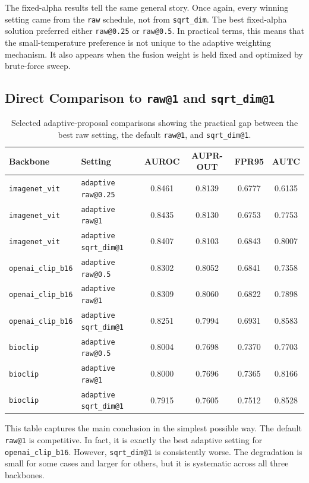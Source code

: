 \documentclass[11pt]{article}
\begin{document}
The fixed-alpha results tell the same general story. Once again, every winning setting came from the \texttt{raw} schedule, not from \texttt{sqrt\_dim}. The best fixed-alpha solution preferred either \texttt{raw@0.25} or \texttt{raw@0.5}. In practical terms, this means that the small-temperature preference is not unique to the adaptive weighting mechanism. It also appears when the fusion weight is held fixed and optimized by brute-force sweep.

\subsection{Direct Comparison to \texttt{raw@1} and \texttt{sqrt\_dim@1}}

\begin{table}[h]
\centering
\small
\begin{tabular}{llcccc}
\toprule
Backbone & Setting & AUROC & AUPR-OUT & FPR95 & AUTC \\
\midrule
\texttt{imagenet\_vit} & \texttt{adaptive raw@0.25} & 0.8461 & 0.8139 & 0.6777 & 0.6135 \\
\texttt{imagenet\_vit} & \texttt{adaptive raw@1} & 0.8435 & 0.8130 & 0.6753 & 0.7753 \\
\texttt{imagenet\_vit} & \texttt{adaptive sqrt\_dim@1} & 0.8407 & 0.8103 & 0.6843 & 0.8007 \\
\midrule
\texttt{openai\_clip\_b16} & \texttt{adaptive raw@0.5} & 0.8302 & 0.8052 & 0.6841 & 0.7358 \\
\texttt{openai\_clip\_b16} & \texttt{adaptive raw@1} & 0.8309 & 0.8060 & 0.6822 & 0.7898 \\
\texttt{openai\_clip\_b16} & \texttt{adaptive sqrt\_dim@1} & 0.8251 & 0.7994 & 0.6931 & 0.8583 \\
\midrule
\texttt{bioclip} & \texttt{adaptive raw@0.5} & 0.8004 & 0.7698 & 0.7370 & 0.7703 \\
\texttt{bioclip} & \texttt{adaptive raw@1} & 0.8000 & 0.7696 & 0.7365 & 0.8166 \\
\texttt{bioclip} & \texttt{adaptive sqrt\_dim@1} & 0.7915 & 0.7605 & 0.7512 & 0.8528 \\
\bottomrule
\end{tabular}
\caption{Selected adaptive-proposal comparisons showing the practical gap between the best raw setting, the default \texttt{raw@1}, and \texttt{sqrt\_dim@1}.}
\end{table}

This table captures the main conclusion in the simplest possible way. The default \texttt{raw@1} is competitive. In fact, it is exactly the best adaptive setting for \texttt{openai\_clip\_b16}. However, \texttt{sqrt\_dim@1} is consistently worse. The degradation is small for some cases and larger for others, but it is systematic across all three backbones.
\end{document}
